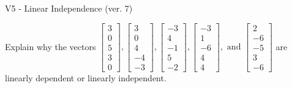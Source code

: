 \begin{exercise}
  \begin{exerciseTitle}V5 - Linear Independence (ver. 7)\end{exerciseTitle}
  \begin{exerciseStatement}
    Explain why the vectors \(\left[\begin{array}{r}
3 \\
0 \\
5 \\
3 \\
0
\end{array}\right] , \left[\begin{array}{r}
3 \\
0 \\
4 \\
-4 \\
-3
\end{array}\right] , \left[\begin{array}{r}
-3 \\
4 \\
-1 \\
5 \\
-2
\end{array}\right] , \left[\begin{array}{r}
-3 \\
1 \\
-6 \\
4 \\
4
\end{array}\right] , \text{ and } \left[\begin{array}{r}
2 \\
-6 \\
-5 \\
3 \\
-6
\end{array}\right]\) are linearly dependent or linearly independent.	



\end{exerciseStatement}
\end{exercise}
